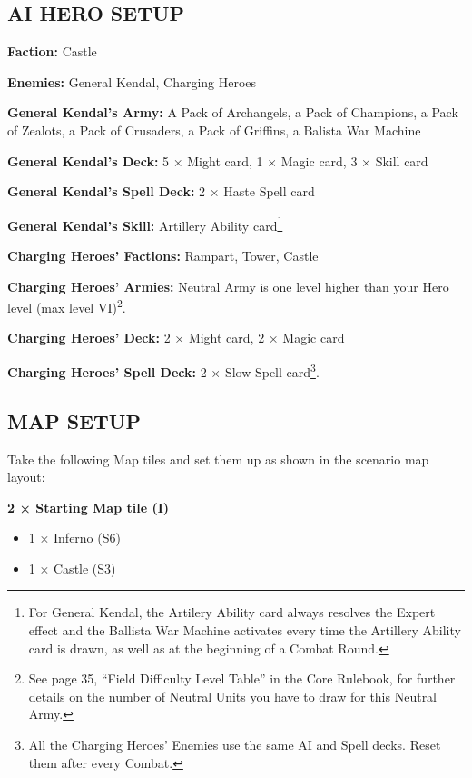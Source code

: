 \begin{multicols*}{2}
\subsection*{\MakeUppercase{AI hero setup}}

\textbf{Faction:} Castle

\textbf{Enemies:} General Kendal, Charging Heroes

\textbf{General Kendal's Army:} A Pack of Archangels, a Pack of Champions, a Pack of Zealots, a Pack of Crusaders, a Pack of Griffins, a Balista War Machine

\textbf{General Kendal's Deck:} 5 × Might card, 1 × Magic card, 3 × Skill card

\textbf{General Kendal's Spell Deck:} 2 × Haste Spell card

\textbf{General Kendal's Skill:} Artillery Ability card\footnote{For General Kendal, the Artilery Ability card always resolves the Expert effect and the Ballista War Machine activates every time the Artillery Ability card is drawn, as well as at the beginning of a Combat Round.}

\textbf{Charging Heroes' Factions:} Rampart, Tower, Castle

\textbf{Charging Heroes' Armies:} Neutral Army is one level higher than your Hero level (max level VI)\footnote{See page 35, ``Field Difficulty Level Table'' in the Core Rulebook, for further details on the number of Neutral Units you have to draw for this Neutral Army.}.

\textbf{Charging Heroes' Deck:} 2 × Might card, 2 × Magic card

\textbf{Charging Heroes' Spell Deck:} 2 × Slow Spell card\footnote{All the Charging Heroes' Enemies use the same AI and Spell decks. Reset them after every Combat.}.

\vspace*{\fill}\columnbreak

\subsection*{\MakeUppercase{Map setup}}

Take the following Map tiles and set them up as shown in the scenario map layout:

\textbf{2 × Starting Map tile (I)}
\begin{itemize}
  \item 1 × Inferno (S6)
  \item 1 × Castle (S3)
\end{itemize}


\end{multicols*}
